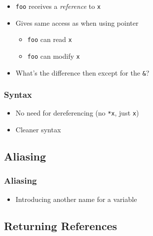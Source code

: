 \begin{frame}
\begin{overprint}
    \begin{itemize}
      \item {\tt foo} receives a \emph{reference} to {\tt x}
      \item Gives same access as when using pointer
            \begin{itemize}
              \item \texttt{foo} can read \texttt{x}
              \item \texttt{foo} can modify \texttt{x}
            \end{itemize}
      \item What's the difference then except for the \texttt{\&}?
    \end{itemize}
  \end{overprint}
\end{frame}

\begin{frame}
  \frametitle{Syntax}
  \begin{itemize}
    \item No need for dereferencing (no \texttt{*x}, just \texttt{x})
    \item Cleaner syntax
  \end{itemize}
\end{frame}

\subsection{Aliasing}
\frame{\tableofcontents[currentsubsection]}


\begin{frame}
  \frametitle{Aliasing}
  \begin{itemize}
    \item Introducing another name for a variable
  \end{itemize}
  \vskip5mm
  \begin{overprint}

  \end{overprint}
\end{frame}

\subsection{Returning References}
\frame{\tableofcontents[currentsubsection]}

